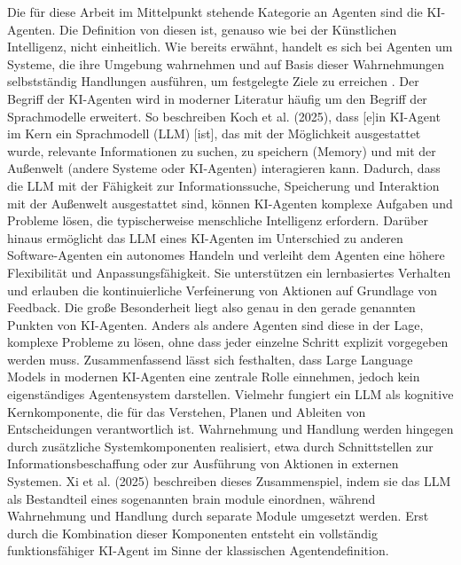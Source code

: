 Die für diese Arbeit im Mittelpunkt stehende Kategorie an Agenten sind die \ac{KI}-Agenten. Die Definition von diesen ist, genauso wie bei der Künstlichen Intelligenz, nicht einheitlich. Wie bereits erwähnt, handelt es sich bei Agenten um Systeme, die ihre Umgebung wahrnehmen und auf Basis dieser Wahrnehmungen selbstständig Handlungen ausführen, um festgelegte Ziele zu erreichen \cite[]{russell_artificial_2016}. Der Begriff der \ac{KI}-Agenten wird in moderner Literatur häufig um den Begriff der Sprachmodelle erweitert. So beschreiben Koch et al. (2025), dass \glqq{} [e]in \ac{KI}-Agent im Kern ein Sprachmodell (LLM) [ist], das mit der Möglichkeit ausgestattet wurde, relevante Informationen zu suchen, zu speichern (Memory) und mit der Außenwelt (andere Systeme oder KI-Agenten) interagieren kann.\grqq{} \cite[]{koch_ki-agenten_2025}
Dadurch, dass die \ac{LLM} mit der Fähigkeit zur Informationssuche, Speicherung und Interaktion mit der Außenwelt ausgestattet sind, können \ac{KI}-Agenten komplexe Aufgaben und Probleme lösen, die typischerweise menschliche Intelligenz erfordern. Darüber hinaus ermöglicht das \ac{LLM} eines \ac{KI}-Agenten im Unterschied zu anderen Software-Agenten ein autonomes Handeln und verleiht dem Agenten eine höhere Flexibilität und Anpassungsfähigkeit. Sie unterstützen ein lernbasiertes Verhalten und erlauben die kontinuierliche Verfeinerung von Aktionen auf Grundlage von Feedback. \cite[]{karrenberg_technologische_2025} 
Die große Besonderheit liegt also genau in den gerade genannten Punkten von \ac{KI}-Agenten. Anders als andere Agenten sind diese in der Lage, komplexe Probleme zu lösen, ohne dass jeder einzelne Schritt explizit vorgegeben werden muss. \cite[]{karrenberg_technologische_2025} Zusammenfassend lässt sich festhalten, dass Large Language Models in modernen \ac{KI}-Agenten eine zentrale Rolle einnehmen, jedoch kein eigenständiges Agentensystem darstellen. Vielmehr fungiert ein LLM als kognitive Kernkomponente, die für das Verstehen, Planen und Ableiten von Entscheidungen verantwortlich ist. Wahrnehmung und Handlung werden hingegen durch zusätzliche Systemkomponenten realisiert, etwa durch Schnittstellen zur Informationsbeschaffung oder zur Ausführung von Aktionen in externen Systemen. Xi et al. (2025) beschreiben dieses Zusammenspiel, indem sie das LLM als Bestandteil eines sogenannten brain module einordnen, während Wahrnehmung und Handlung durch separate Module umgesetzt werden. Erst durch die Kombination dieser Komponenten entsteht ein vollständig funktionsfähiger \ac{KI}-Agent im Sinne der klassischen Agentendefinition. \cite[\pagef 1ff]{xi_rise_2025}
